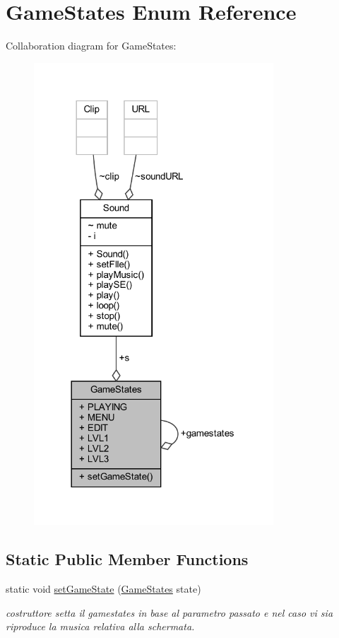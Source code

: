 \hypertarget{enumprogetto_1_1_game_states}{}\section{Game\+States Enum Reference}
\label{enumprogetto_1_1_game_states}


Collaboration diagram for Game\+States\+:\nopagebreak
\begin{figure}[H]
\begin{center}
\leavevmode
\includegraphics[width=254pt]{enumprogetto_1_1_game_states__coll__graph}
\end{center}
\end{figure}
\subsection*{Static Public Member Functions}
\begin{DoxyCompactItemize}
\item 
static void \hyperlink{enumprogetto_1_1_game_states_a118b00363a0d1055d4b00bb40dd66f34}{set\+Game\+State} (\hyperlink{enumprogetto_1_1_game_states}{Game\+States} state)
\begin{DoxyCompactList}\small\item\em costruttore setta il gamestates in base al parametro passato e nel caso vi sia riproduce la musica relativa alla schermata. \end{DoxyCompactList}\end{DoxyCompactItemize}
